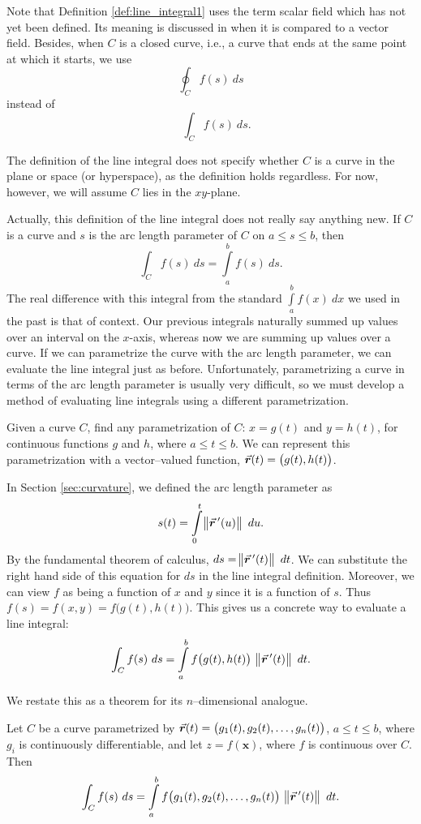 Note that Definition \ref{def:line_integral1} uses the term scalar field which has not yet been defined. Its meaning is discussed in  when it is compared to a vector field. Besides, when $C$ is a closed curve, i.e., a curve that ends at the same point at which it starts,  we use 
$$
\oint_C f(s)\ ds$$
instead of
$$
\quad \int_C f(s)\ ds.$$

The definition of the line integral does not specify whether $C$ is a curve in the plane or space (or hyperspace), as the definition holds regardless. For now, however, we will assume $C$ lies in the $xy$-plane.

Actually, this definition of the line integral  does not really say anything new. If $C$ is a curve and $s$ is the arc length parameter of $C$ on $a\leq s\leq b$, then 
$$\int_Cf(s)\ ds = \int\limits_a^bf(s)\ ds.$$
The real difference with this integral from the standard $\int\limits_a^bf(x)\ dx$ we used in the past is that of context. Our previous integrals naturally summed up values over an interval on the $x$-axis, whereas now we are summing up values over a curve. If we can parametrize the curve with the arc length parameter, we can evaluate the line integral just as before. Unfortunately, parametrizing a curve in terms of the arc length parameter is usually very difficult, so we must develop a method of evaluating line integrals using a different parametrization.

Given a curve $C$, find any parametrization of $C$: $x = g(t)$ and $y=h(t)$, for continuous functions $g$ and $h$, where $a\leq t\leq b$. We can represent this parametrization with a vector--valued function, \linebreak $\vrt = \left( g(t),h(t)\right)$.

In Section \ref{sec:curvature}, we defined the arc length parameter as 
$$
s(t) = \int\limits_0^t \norm{\vec r\,'(u)}\ du. 
$$
By the fundamental theorem of calculus, $ds = \norm{\vec r\,'(t)}\ dt$. We can substitute the right hand side of this equation for $ds$ in the line integral definition. Moreover, we can view $f$ as being a function of $x$ and $y$ since it is a function of $s$. Thus $f(s) =f(x,y) =f\big(g(t),h(t)\big)$. This gives us a concrete way to evaluate a line integral:
$$\int_C f(s)\ ds = \int\limits_a^bf\big(g(t),h(t)\big)\ \norm{\vec r\,'(t)}\ dt.$$

We restate this as a theorem for its $n$--dimensional analogue.

\begin{theorem}\label{thm:line1}
Let $C$ be a curve parametrized by $\vrt =\left( g_1(t), g_2(t),\ldots,g_n(t)\right)$, $a\leq t\leq b$, where $g_i$ is continuously differentiable, and let $z=f(\mathbf{x})$, where $f$ is continuous over $C$. Then%
	$$\int_Cf(s)\ ds = \int\limits_a^bf\big(g_1(t),g_2(t),\ldots,g_n(t)\big)\ \norm{\vec r\,'(t)}\ dt.$$
\end{theorem}


